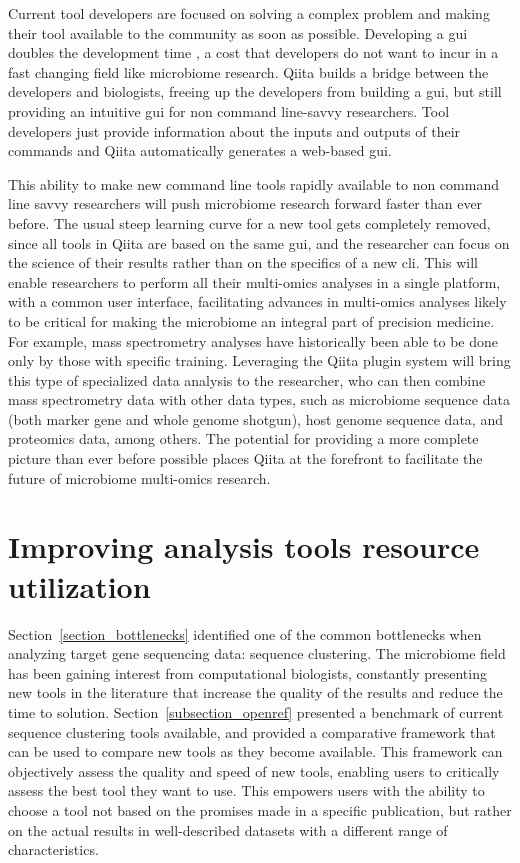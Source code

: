 Current tool developers are focused on solving a complex problem and making their
tool available to the community as soon as possible. Developing a \gls{gui} doubles
the development time \cite{Myers1992}, a cost that developers do not want to incur
in a fast changing field like microbiome research. Qiita builds a bridge between
the developers and biologists, freeing up the developers from building a \gls{gui},
but still providing an intuitive \gls{gui} for non command line-savvy researchers.
Tool developers just provide information about the inputs and outputs of their
commands and Qiita automatically generates a web-based \gls{gui}.

This ability to make new command line tools rapidly available to non command line
savvy researchers will push microbiome research forward faster than ever before.
The usual steep learning curve for a new tool gets completely removed, since all
tools in Qiita are based on the same \gls{gui}, and the researcher can focus on
the science of their results rather than on the specifics of a new \gls{cli}.
This will enable researchers to perform all their multi-omics analyses in a
single platform, with a common user interface, facilitating advances in
multi-omics analyses likely to be critical for making the microbiome an integral
part of precision medicine. For example, mass spectrometry analyses have
historically been able to be done only by those with specific training.
Leveraging the Qiita plugin system will bring this type of specialized data analysis
to the researcher, who can then combine mass spectrometry data with other data types,
such as microbiome sequence data (both marker gene and whole genome shotgun), host
genome sequence data, and proteomics data, among others. The potential for
providing a more complete picture than ever before possible places Qiita at the
forefront to facilitate the future of microbiome multi-omics research.

\section{Improving analysis tools resource utilization}
Section~\ref{section_bottlenecks} identified one of the common bottlenecks when
analyzing target gene sequencing data: sequence clustering. The microbiome field
has been gaining interest from computational biologists, constantly presenting new
tools in the literature that increase the quality of the results and reduce the
time to solution. Section~\ref{subsection_openref} presented a benchmark of
current sequence clustering tools available, and provided a comparative framework
that can be used to compare new tools as they become available. This framework can
objectively assess the quality and speed of new tools, enabling users to
critically assess the best tool they want to use. This empowers users with the
ability to choose a tool not based on the promises made in a specific publication,
but rather on the actual results in well-described datasets with a different range of
characteristics.


